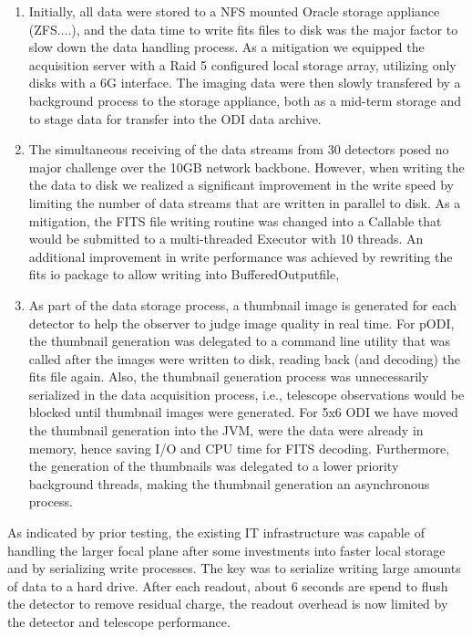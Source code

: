 \documentclass[draft]{spieman}
\begin{document}
\begin{enumerate} 
    
\item Initially, all data were stored to a NFS mounted Oracle storage appliance
(ZFS....), and the data time to write fits files to disk was the major factor to
slow down the data handling process. As a mitigation we equipped the acquisition
server with a Raid 5 configured local storage array, utilizing only disks with a
6G interface. The imaging data were then slowly transfered by a background
process to the storage appliance, both as a mid-term storage and to stage data
for transfer into the ODI data archive.

\item  The simultaneous receiving of the data streams from 30 detectors posed no
major challenge over the 10GB network backbone.  However, when writing the the
data to disk we realized a significant  improvement in the write speed by
limiting the number of data streams that are written in parallel to disk. As a
mitigation, the FITS file writing routine was changed into a Callable that would
be submitted to a multi-threaded Executor with 10 threads. An additional
improvement in write performance was achieved by rewriting the fits io package
to allow writing into BufferedOutputfile,

\item As part of the data storage process, a thumbnail image is generated for
each detector to help the observer to judge image quality in real time. For
pODI, the thumbnail generation was delegated to a command line utility that was
called after the images were written to disk, reading back (and decoding) the
fits file again. Also, the thumbnail generation process was unnecessarily
serialized in the data acquisition process, i.e., telescope observations would
be blocked until thumbnail images were generated.  For 5x6 ODI we have moved the
thumbnail generation into the JVM, were the data were already in memory, hence
saving I/O and CPU time for FITS decoding. Furthermore, the generation of the
thumbnails was delegated to a lower priority background threads, making the
thumbnail generation an asynchronous process.

    
\end{enumerate}

As indicated by prior testing, the existing IT infrastructure was capable of
handling the larger focal plane after some investments into faster local
storage and by serializing write processes. The key was to serialize writing
large amounts of data to a hard drive. After each readout, about 6 seconds
are spend to flush the detector to remove residual charge, the readout
overhead is now limited by the detector and telescope performance.
\end{document}
